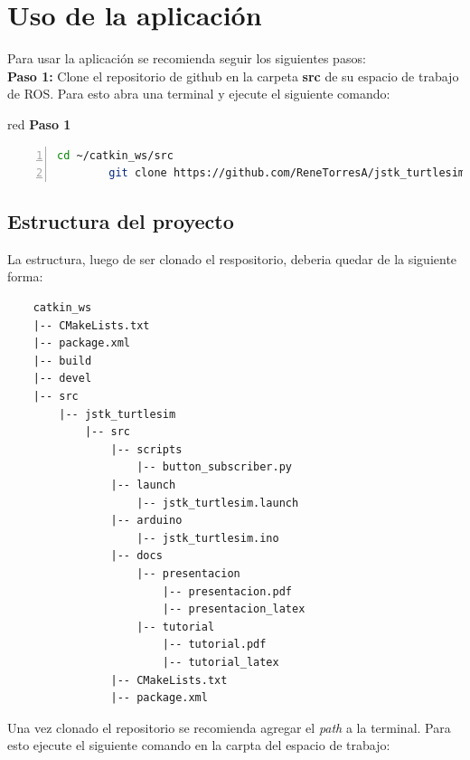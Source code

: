 \documentclass{article}
\begin{document}
\section{Uso de la aplicación}

Para usar la aplicación se recomienda seguir los siguientes pasos:\\

\textbf{Paso 1:} Clone el repositorio de github en la carpeta \textbf{src} de su espacio de trabajo de ROS. Para esto abra una terminal y ejecute el siguiente comando:

\begin{bodyblock}{red}{ \textbf{Paso 1}}
  \begin{lstlisting}[language=bash, mathescape=true, breaklines=true,numbers=left,
    xleftmargin=0.03\textwidth, columns=fullflexible, flexiblecolumns=true, gobble=8]
        cd ~/catkin_ws/src
        git clone https://github.com/ReneTorresA/jstk_turtlesim.git
  \end{lstlisting}
\end{bodyblock}

\subsection{Estructura del proyecto}

La estructura, luego de ser clonado el respositorio, deberia quedar de la siguiente forma:

\begin{center}
  \begin{verbatim}
    catkin_ws
    |-- CMakeLists.txt
    |-- package.xml
    |-- build
    |-- devel
    |-- src
        |-- jstk_turtlesim
            |-- src
                |-- scripts
                    |-- button_subscriber.py
                |-- launch
                    |-- jstk_turtlesim.launch
                |-- arduino
                    |-- jstk_turtlesim.ino
                |-- docs
                    |-- presentacion
                        |-- presentacion.pdf
                        |-- presentacion_latex
                    |-- tutorial
                        |-- tutorial.pdf
                        |-- tutorial_latex
                |-- CMakeLists.txt
                |-- package.xml
  \end{verbatim}
  
\end{center}

Una vez clonado el repositorio se recomienda agregar el \textit{path} a la terminal. Para esto ejecute el siguiente comando en la carpta del espacio de trabajo:
\end{document}
